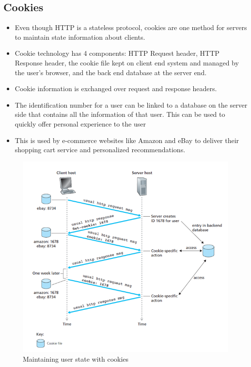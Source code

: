 \documentclass{article}
\theoremstyle{plain}
\theoremstyle{definition}
\begin{document}
\subsection{Cookies}
\begin{itemize}
    \item Even though HTTP is a stateless protocol, cookies are one method for servers to maintain state information about clients.
    
    \item Cookie technology has 4 components: HTTP Request header, HTTP Response header, the cookie file kept on client end system and managed by the user's browser, and the back end database at the server end. 
    
    \item Cookie information is exchanged over request and response headers.
    
    \item The identification number for a user can be linked to a database on the server side that contains all the information of that user. This can be used to quickly offer personal experience to the user
    
    \item This is used by e-commerce websites like Amazon and eBay to deliver their shopping cart service and personalized recommendations.
\end{itemize}
\begin{figure}[!ht]
    \centering
    \includegraphics[scale=0.7]{cn6.png}
    \caption{Maintaining user state with cookies}
    \label{fig:my_label_6}
\end{figure}
\end{document}
